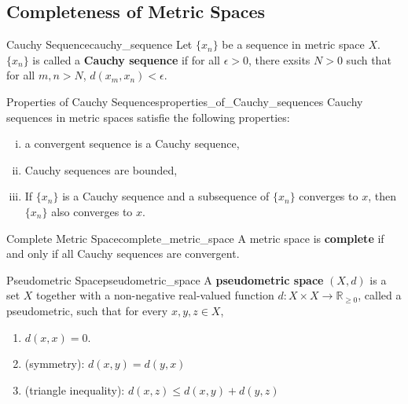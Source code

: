 \documentclass{report}
\begin{document}
\subsection{Completeness of Metric Spaces}
\begin{definition}{Cauchy Sequence}{cauchy_sequence}
	Let $\{x_n\}$ be a sequence in metric space $X$. $\{x_n\}$ is called a \textbf{Cauchy sequence} if for all $\epsilon>0$, there exsits $N>0$ such that for all $m,n>N$, $d(x_m,x_n)<\epsilon$.
\end{definition}

\begin{proposition}{Properties of Cauchy Sequences}{properties_of_Cauchy_sequences}
	Cauchy sequences in metric spaces satisfie the following properties:
	\begin{enumerate}[(i)]
		\item a convergent sequence is a Cauchy sequence,
		\item Cauchy sequences are bounded,
		\item If $\{x_n\}$ is a Cauchy sequence and a subsequence of $\{x_n\}$ converges to $x$, then $\{x_n\}$ also converges to $x$.
	\end{enumerate}
\end{proposition}

\begin{definition}{Complete Metric Space}{complete_metric_space}
	A metric space is \textbf{complete} if and only if all Cauchy sequences are convergent.
\end{definition}

\begin{definition}{Pseudometric Space}{pseudometric_space}
	A \textbf{pseudometric space} $(X, d)$ is a set $X$ together with a non-negative real-valued function $d: X \times X \longrightarrow \mathbb{R}_{\geq 0}$, called a pseudometric, such that for every $x, y, z \in X$,
	\begin{enumerate}
		\item $d(x, x)=0$.
		\item (symmetry): $d(x, y)=d(y, x)$
		\item (triangle inequality): $d(x, z) \leq d(x, y)+d(y, z)$
	\end{enumerate}
\end{definition}
\end{document}
